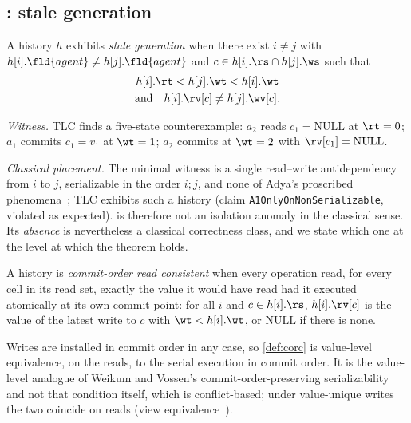 \subsection{: stale generation}
\label{sec:a1}
\begin{definition}
\label{def:a1}
A history $h$ exhibits \emph{stale generation} when there exist
$i\neq j$ with $h[i].\fld{agent}\neq h[j].\fld{agent}$ and
$c\in h[i].\rs\cap h[j].\ws$ such that
\[
  \begin{gathered}
  h[i].\rt < h[j].\wt < h[i].\wt\\
  \text{and}\quad h[i].\rv[c] \neq h[j].\wv[c].
  \end{gathered}
\]
\end{definition}

\noindent\emph{Witness.} TLC finds a five-state counterexample: $a_2$ reads
$c_1=\mathrm{NULL}$ at $\rt=0$; $a_1$ commits $c_1=v_1$ at $\wt=1$; $a_2$
commits at $\wt=2$ with $\rv[c_1]=\mathrm{NULL}$.

\smallskip\noindent\emph{Classical placement.} The minimal witness is a single
read--write antidependency from $i$ to $j$, serializable in the order $i;j$,
and none of Adya's proscribed phenomena~\cite{Adya1999}; TLC exhibits such a
history (claim \texttt{A1OnlyOnNonSerializable}, violated as expected). 
is therefore not an isolation anomaly in the classical sense. Its
\emph{absence} is nevertheless a classical correctness class, and we state
which one at the level at which the theorem holds.

\begin{definition}
\label{def:corc}
A history is \emph{commit-order read consistent} when every operation read, for
every cell in its read set, exactly the value it would have read had it
executed atomically at its own commit point: for all $i$ and $c\in h[i].\rs$,
$h[i].\rv[c]$ is the value of the latest write to $c$ with
$\wt<h[i].\wt$, or $\mathrm{NULL}$ if there is none.
\end{definition}

Writes are installed in commit order in any case, so \cref{def:corc} is
value-level equivalence, on the reads, to the serial execution in commit
order. It is the value-level analogue of Weikum and Vossen's
commit-order-preserving serializability~\cite{WeikumVossen2001} and not that
condition itself, which is conflict-based; under value-unique writes the two
coincide on reads (view equivalence~\cite{Papadimitriou1979}).

